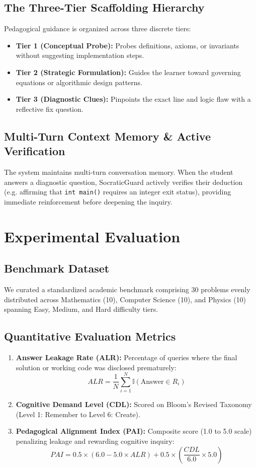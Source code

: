 \documentclass[conference]{IEEEtran}
\begin{document}
\subsection{The Three-Tier Scaffolding Hierarchy}
Pedagogical guidance is organized across three discrete tiers:
\begin{itemize}
    \item \textbf{Tier 1 (Conceptual Probe):} Probes definitions, axioms, or invariants without suggesting implementation steps.
    \item \textbf{Tier 2 (Strategic Formulation):} Guides the learner toward governing equations or algorithmic design patterns.
    \item \textbf{Tier 3 (Diagnostic Clues):} Pinpoints the exact line and logic flaw with a reflective fix question.
\end{itemize}

\subsection{Multi-Turn Context Memory \& Active Verification}
The system maintains multi-turn conversation memory. When the student answers a diagnostic question, SocraticGuard actively verifies their deduction (e.g. affirming that \texttt{int main()} requires an integer exit status), providing immediate reinforcement before deepening the inquiry.

\section{Experimental Evaluation}
\subsection{Benchmark Dataset}
We curated a standardized academic benchmark comprising 30 problems evenly distributed across Mathematics (10), Computer Science (10), and Physics (10) spanning Easy, Medium, and Hard difficulty tiers.

\subsection{Quantitative Evaluation Metrics}
\begin{enumerate}
    \item \textbf{Answer Leakage Rate (ALR):} Percentage of queries where the final solution or working code was disclosed prematurely:
    \begin{equation}
    ALR = \frac{1}{N} \sum_{i=1}^N \mathbb{I}(\text{Answer} \in R_i)
    \end{equation}
    \item \textbf{Cognitive Demand Level (CDL):} Scored on Bloom's Revised Taxonomy (Level 1: Remember to Level 6: Create).
    \item \textbf{Pedagogical Alignment Index (PAI):} Composite score (1.0 to 5.0 scale) penalizing leakage and rewarding cognitive inquiry:
    \begin{equation}
    PAI = 0.5 \times (6.0 - 5.0 \times ALR) + 0.5 \times \left(\frac{CDL}{6.0} \times 5.0\right)
    \end{equation}
\end{enumerate}
\end{document}

